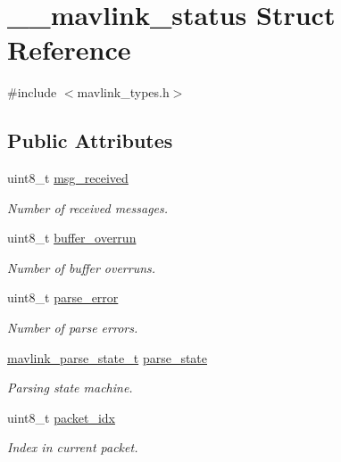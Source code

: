 \hypertarget{struct____mavlink__status}{}\section{\+\_\+\+\_\+mavlink\+\_\+status Struct Reference}
\label{struct____mavlink__status}


{\ttfamily \#include $<$mavlink\+\_\+types.\+h$>$}

\subsection*{Public Attributes}
\begin{DoxyCompactItemize}
\item 
uint8\+\_\+t \hyperlink{struct____mavlink__status_a183576e45facc9da8123b7866d458680}{msg\+\_\+received}
\begin{DoxyCompactList}\small\item\em Number of received messages. \end{DoxyCompactList}\item 
uint8\+\_\+t \hyperlink{struct____mavlink__status_ae0ceb5a136021ee78c953f2e86d772cb}{buffer\+\_\+overrun}
\begin{DoxyCompactList}\small\item\em Number of buffer overruns. \end{DoxyCompactList}\item 
uint8\+\_\+t \hyperlink{struct____mavlink__status_ae7a52aa0c84929dbf181220c689f9ec8}{parse\+\_\+error}
\begin{DoxyCompactList}\small\item\em Number of parse errors. \end{DoxyCompactList}\item 
\hyperlink{mavlink__types_8h_a4eeb14ddb07e997fe1d671d6823e35a1}{mavlink\+\_\+parse\+\_\+state\+\_\+t} \hyperlink{struct____mavlink__status_aaf6742a61bbc641a4600184b3260fa0f}{parse\+\_\+state}
\begin{DoxyCompactList}\small\item\em Parsing state machine. \end{DoxyCompactList}\item 
uint8\+\_\+t \hyperlink{struct____mavlink__status_a3e582235849323267974003eb1793e25}{packet\+\_\+idx}
\begin{DoxyCompactList}\small\item\em Index in current packet. \end{DoxyCompactList}\item 

\end{DoxyCompactItemize}

